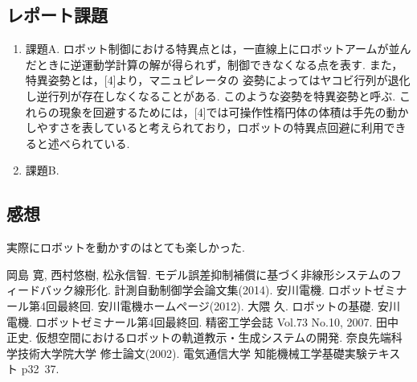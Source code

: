 \documentclass[twocolumn, 10pt,a4j]{jsarticle}
\begin{document}
  \subsection{レポート課題}
    \begin{enumerate}
      \item 課題A.
        ロボット制御における特異点とは，一直線上にロボットアームが並んだときに逆運動学計算の解が得られず，制御できなくなる点を表す. また，特異姿勢とは，[4]より，マニュピレータの
        姿勢によってはヤコビ行列が退化し逆行列が存在しなくなることがある. このような姿勢を特異姿勢と呼ぶ.
        これらの現象を回避するためには，[4]では可操作性楕円体の体積は手先の動かしやすさを表していると考えられており，ロボットの特異点回避に利用できると述べられている.
      \item 課題B.
    \end{enumerate}

  \subsection{感想}
    実際にロボットを動かすのはとても楽しかった. 


\begin{thebibliography}{3}
岡島 寛, 西村悠樹, 松永信智. モデル誤差抑制補償に基づく非線形システムのフィードバック線形化. 計測自動制御学会論文集(2014).
安川電機. ロボットゼミナール第4回最終回. 安川電機ホームページ(2012).
大隈 久. ロボットの基礎. 安川電機. ロボットゼミナール第4回最終回. 精密工学会誌 Vol.73 No.10, 2007.
田中 正史. 仮想空間におけるロボットの軌道教示・生成システムの開発. 奈良先端科学技術大学院大学 修士論文(2002).
電気通信大学 知能機械工学基礎実験テキスト p32~37.

\end{thebibliography}
\end{document}
